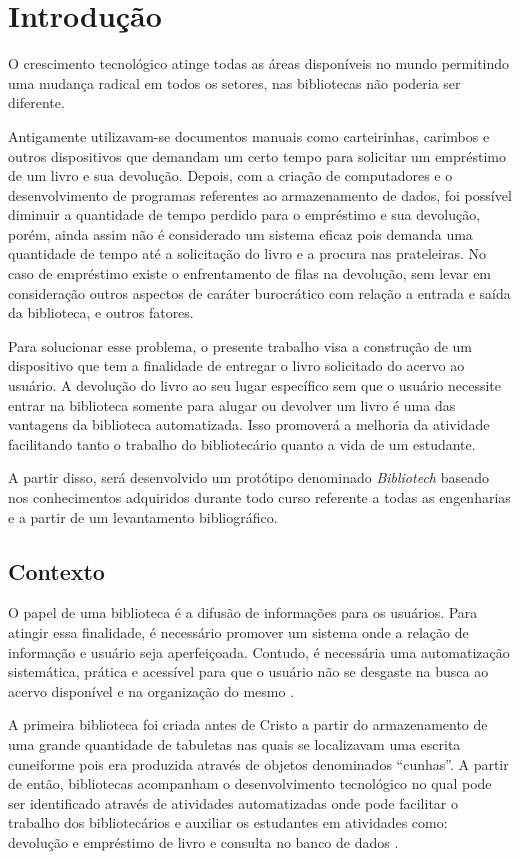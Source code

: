 \chapter{Introdução}
O crescimento tecnológico atinge todas as áreas disponíveis no mundo permitindo uma mudança radical em todos os setores, nas bibliotecas não poderia ser diferente.

Antigamente utilizavam-se documentos manuais como carteirinhas, carimbos e outros dispositivos que demandam um certo tempo para solicitar um empréstimo de um livro e sua devolução. Depois, com a criação de computadores e o desenvolvimento de programas referentes ao armazenamento de dados, foi possível diminuir a quantidade de tempo perdido para o empréstimo e sua devolução, porém, ainda assim não é considerado um sistema eficaz pois demanda uma quantidade de tempo até a solicitação do livro e a procura nas prateleiras. No caso de empréstimo existe o enfrentamento de filas na devolução, sem levar em consideração outros aspectos de caráter burocrático com relação a entrada e saída da biblioteca, e outros fatores.

Para solucionar esse problema, o presente trabalho visa a construção de um dispositivo que tem a finalidade de entregar o livro solicitado do acervo ao usuário. A devolução do livro ao seu lugar específico sem que o usuário necessite entrar na biblioteca somente para alugar ou devolver um livro é uma das vantagens da biblioteca automatizada. Isso promoverá a melhoria da atividade facilitando tanto o trabalho do bibliotecário quanto a vida de um estudante.

A partir disso, será desenvolvido um protótipo denominado \textit{Bibliotech} baseado nos conhecimentos adquiridos durante todo curso referente a todas as engenharias e a partir de um levantamento bibliográfico.

\section{Contexto}

O papel de uma biblioteca é a difusão de informações para os usuários. Para atingir essa finalidade, é necessário promover um sistema onde a relação de informação e usuário seja aperfeiçoada. Contudo, é necessária uma automatização sistemática, prática e acessível para que o usuário não se desgaste na busca ao acervo disponível e na organização do mesmo \cite{melo2014}. 

A primeira biblioteca foi criada antes de Cristo a partir do armazenamento de uma grande quantidade de tabuletas nas quais se localizavam uma escrita cuneiforme pois era produzida através de objetos denominados “cunhas”. A partir de então, bibliotecas acompanham o desenvolvimento tecnológico no qual pode ser identificado através de atividades automatizadas onde pode facilitar o trabalho dos bibliotecários e auxiliar os estudantes em atividades como: devolução e empréstimo de livro e consulta no banco de dados \cite{santana2015}.

